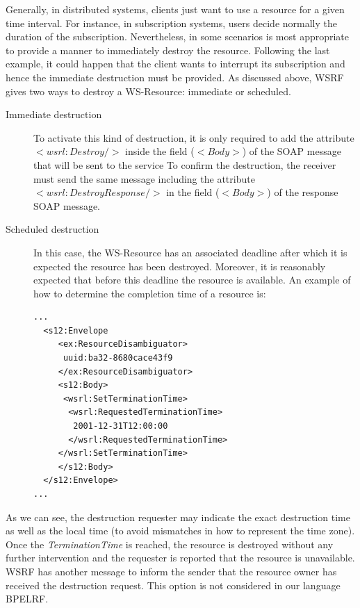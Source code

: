 Generally, in distributed systems, clients just want to use a resource for a given time interval.
For instance, in subscription systems, users decide normally the duration of the subscription.
Nevertheless, in some scenarios is most appropriate to provide a manner to immediately destroy 
the resource. Following the last example, it could happen that the client wants to interrupt its subscription 
and hence the immediate destruction must be provided. 
As discussed above, WSRF gives two ways to destroy a 
WS-Resource: immediate or scheduled.

\begin{description}
\item[Immediate destruction] To activate this kind of destruction, it is only required to add the attribute
\emph{$<wsrl:Destroy/>$} inside the field ($<Body>$) of the SOAP message that will be sent to the service
To confirm the destruction, the receiver must send the same message including the attribute
\emph{$<wsrl:DestroyResponse/>$} in the field (\emph{$<Body>$}) of the response SOAP message.

\item[Scheduled destruction] 
In this case, the WS-Resource has an associated deadline 
after which it is expected the resource has been destroyed. Moreover,
it is reasonably expected that before this deadline the resource is available. 
An example of how to determine the completion time of a resource is:

\newpage

\lstset{language=XML, numbersep=5pt, frame=single}
\begin{lstlisting}
...
  <s12:Envelope
     <ex:ResourceDisambiguator>
      uuid:ba32-8680cace43f9
     </ex:ResourceDisambiguator>
     <s12:Body>
      <wsrl:SetTerminationTime>
       <wsrl:RequestedTerminationTime>
        2001-12-31T12:00:00
       </wsrl:RequestedTerminationTime>
     </wsrl:SetTerminationTime>
     </s12:Body>
  </s12:Envelope>
...
\end{lstlisting}
\end{description}

As we can see, the destruction requester may indicate 
the exact destruction time as well as the local time (to avoid mismatches in how to represent the time zone). 
Once the \emph{TerminationTime} is reached, the resource is destroyed
without any further intervention and the requester is reported that 
the resource is unavailable. WSRF has another message to 
inform the sender that the resource owner has received the destruction request. This option
is not considered in our language BPELRF.

